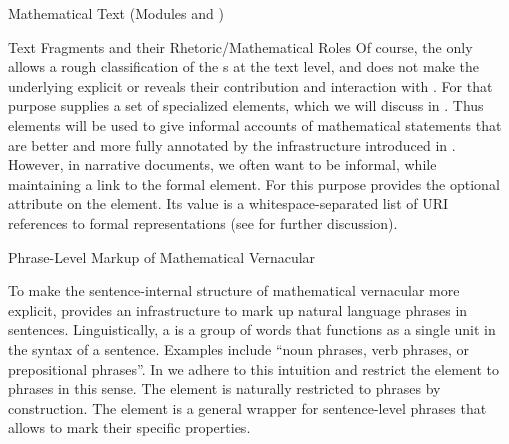 \begin{tchapter}[id=mtxt,short=Mathematical Text]{Mathematical Text (Modules
  {} and {})}
\begin{tsection}[id=omtext]{Text Fragments and their Rhetoric/Mathematical Roles}
Of course, the {} only allows a rough classification of the
{s} at the text level, and does not make the underlying
{} explicit or reveals their contribution and interaction with
{}.  For that purpose {\omdoc} supplies a set of
specialized elements, which we will discuss in {}.  Thus
{} elements will be used to give informal accounts of mathematical
statements that are better and more fully annotated by the infrastructure introduced in
{}. However, in narrative documents, we often want to be informal,
while maintaining a link to the formal element. For this purpose {\omdoc} provides the
optional {} attribute on the {} element. Its
value is a whitespace-separated list of URI references to formal representations (see
{} for further discussion).
\end{tsection}

\begin{tsection}[id=phrases]{Phrase-Level Markup of Mathematical Vernacular}

  To make the sentence-internal structure of mathematical vernacular more explicit,
  {\omdoc} provides an infrastructure to mark up natural language phrases in
  sentences. Linguistically, a {} is a group of words that functions as a
  single unit in the syntax of a sentence. Examples include ``noun phrases, verb phrases,
  or prepositional phrases''. In {\omdoc} we adhere to this intuition and restrict the
  {} element to phrases in this sense. The {} element is
  naturally restricted to phrases by construction.  The {} element is a
  general wrapper for sentence-level phrases that allows to mark their specific
  properties.


\end{tsection}
\end{tchapter}
